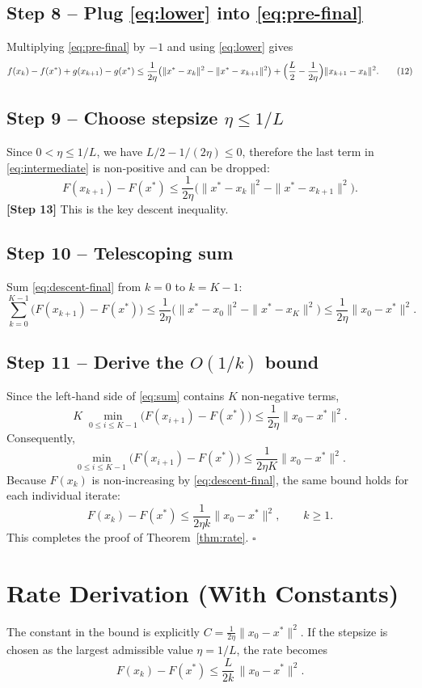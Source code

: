 \documentclass{article}
\begin{document}
\subsection*{Step 8 – Plug \eqref{eq:lower} into \eqref{eq:pre-final}}
Multiplying \eqref{eq:pre-final} by $-1$ and using \eqref{eq:lower} gives
\[
f(x_{k})-f(x^{*}) + g(x_{k+1})-g(x^{*})
\le \frac{1}{2\eta}\bigl(\|x^{*}-x_{k}\|^{2}-\|x^{*}-x_{k+1}\|^{2}\bigr)
+\Bigl(\frac{L}{2}-\frac{1}{2\eta}\Bigr)\|x_{k+1}-x_{k}\|^{2}.
\tag{12}
\label{eq:intermediate}
\]

\subsection*{Step 9 – Choose stepsize $\eta\le 1/L$}
Since $0<\eta\le 1/L$, we have $L/2-1/(2\eta)\le 0$, therefore the last term in \eqref{eq:intermediate} is non‑positive and can be dropped:
\[
F(x_{k+1})-F(x^{*})
\le \frac{1}{2\eta}\bigl(\|x^{*}-x_{k}\|^{2}-\|x^{*}-x_{k+1}\|^{2}\bigr).
\tag{13}
\label{eq:descent-final}
\]
\textbf{[Step 13]} This is the key descent inequality.

\subsection*{Step 10 – Telescoping sum}
Sum \eqref{eq:descent-final} from $k=0$ to $k=K-1$:
\[
\sum_{k=0}^{K-1}\bigl(F(x_{k+1})-F(x^{*})\bigr)
\le \frac{1}{2\eta}\bigl(\|x^{*}-x_{0}\|^{2}-\|x^{*}-x_{K}\|^{2}\bigr)
\le \frac{1}{2\eta}\|x_{0}-x^{*}\|^{2}.
\tag{14}
\label{eq:sum}
\]

\subsection*{Step 11 – Derive the $O(1/k)$ bound}
Since the left‑hand side of \eqref{eq:sum} contains $K$ non‑negative terms,
\[
K\;\min_{0\le i\le K-1}\bigl(F(x_{i+1})-F(x^{*})\bigr)
\le \frac{1}{2\eta}\|x_{0}-x^{*}\|^{2}.
\]
Consequently,
\[
\min_{0\le i\le K-1}\bigl(F(x_{i+1})-F(x^{*})\bigr)
\le \frac{1}{2\eta K}\|x_{0}-x^{*}\|^{2}.
\tag{15}
\label{eq:rate}
\]
Because $F(x_{k})$ is non‑increasing by \eqref{eq:descent-final}, the same bound holds for each individual iterate:
\[
F(x_{k})-F(x^{*})\le\frac{1}{2\eta k}\|x_{0}-x^{*}\|^{2},\qquad k\ge1.
\]
This completes the proof of Theorem~\ref{thm:rate}. \hfill $\square$

\section*{Rate Derivation (With Constants)}
The constant in the bound is explicitly $C=\frac{1}{2\eta}\|x_{0}-x^{*}\|^{2}$. If the stepsize is chosen as the largest admissible value $\eta=1/L$, the rate becomes
\[
F(x_{k})-F(x^{*})\le \frac{L}{2k}\,\|x_{0}-x^{*}\|^{2}.
\]
\end{document}
